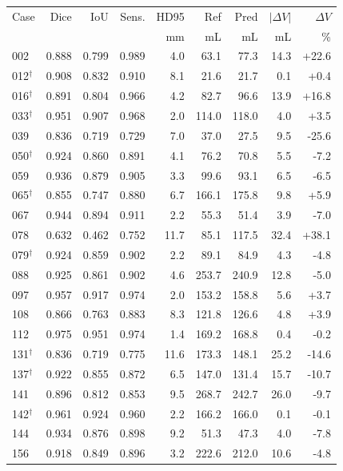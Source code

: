 {\scriptsize\setlength{\tabcolsep}{3pt}
\begin{tabular}{@{}lrrrrrrrr@{}}\toprule
Case & Dice & IoU & Sens. & HD95 & Ref & Pred & $|\Delta V|$ & $\Delta V$ \\
 & & & & mm & mL & mL & mL & \% \\\midrule
002 & 0.888 & 0.799 & 0.989 & 4.0 & 63.1 & 77.3 & 14.3 & +22.6 \\
012$^\dagger$ & 0.908 & 0.832 & 0.910 & 8.1 & 21.6 & 21.7 & 0.1 & +0.4 \\
016$^\dagger$ & 0.891 & 0.804 & 0.966 & 4.2 & 82.7 & 96.6 & 13.9 & +16.8 \\
033$^\dagger$ & 0.951 & 0.907 & 0.968 & 2.0 & 114.0 & 118.0 & 4.0 & +3.5 \\
039 & 0.836 & 0.719 & 0.729 & 7.0 & 37.0 & 27.5 & 9.5 & -25.6 \\
050$^\dagger$ & 0.924 & 0.860 & 0.891 & 4.1 & 76.2 & 70.8 & 5.5 & -7.2 \\
059 & 0.936 & 0.879 & 0.905 & 3.3 & 99.6 & 93.1 & 6.5 & -6.5 \\
065$^\dagger$ & 0.855 & 0.747 & 0.880 & 6.7 & 166.1 & 175.8 & 9.8 & +5.9 \\
067 & 0.944 & 0.894 & 0.911 & 2.2 & 55.3 & 51.4 & 3.9 & -7.0 \\
078 & 0.632 & 0.462 & 0.752 & 11.7 & 85.1 & 117.5 & 32.4 & +38.1 \\
079$^\dagger$ & 0.924 & 0.859 & 0.902 & 2.2 & 89.1 & 84.9 & 4.3 & -4.8 \\
088 & 0.925 & 0.861 & 0.902 & 4.6 & 253.7 & 240.9 & 12.8 & -5.0 \\
097 & 0.957 & 0.917 & 0.974 & 2.0 & 153.2 & 158.8 & 5.6 & +3.7 \\
108 & 0.866 & 0.763 & 0.883 & 8.3 & 121.8 & 126.6 & 4.8 & +3.9 \\
112 & 0.975 & 0.951 & 0.974 & 1.4 & 169.2 & 168.8 & 0.4 & -0.2 \\
131$^\dagger$ & 0.836 & 0.719 & 0.775 & 11.6 & 173.3 & 148.1 & 25.2 & -14.6 \\
137$^\dagger$ & 0.922 & 0.855 & 0.872 & 6.5 & 147.0 & 131.4 & 15.7 & -10.7 \\
141 & 0.896 & 0.812 & 0.853 & 9.5 & 268.7 & 242.7 & 26.0 & -9.7 \\
142$^\dagger$ & 0.961 & 0.924 & 0.960 & 2.2 & 166.2 & 166.0 & 0.1 & -0.1 \\
144 & 0.934 & 0.876 & 0.898 & 9.2 & 51.3 & 47.3 & 4.0 & -7.8 \\
156 & 0.918 & 0.849 & 0.896 & 3.2 & 222.6 & 212.0 & 10.6 & -4.8 \\

\end{tabular}}
